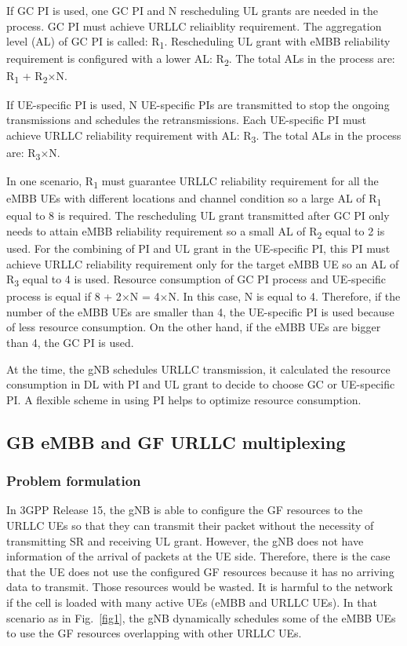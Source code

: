 \documentclass{ieeeaccess}
\begin{document}
If GC PI is used, one GC PI and N rescheduling UL grants are needed in the process. GC PI must achieve URLLC reliaiblity requirement. The aggregation level (AL) of GC PI is called: R\textsubscript{1}. Rescheduling UL grant with eMBB reliability requirement is configured with a lower AL: R\textsubscript{2}. The total ALs in the process are: R\textsubscript{1} + R\textsubscript{2}$\times$N.

If UE-specific PI is used, N UE-specific PIs are transmitted to stop the ongoing transmissions and schedules the retransmissions. Each UE-specific PI must achieve URLLC reliability requirement with AL: R\textsubscript{3}. The total ALs in the process are: R\textsubscript{3}$\times$N.

In one scenario, R\textsubscript{1} must guarantee URLLC reliability requirement for all the eMBB UEs with different locations and channel condition so a large AL of R\textsubscript{1} equal to 8 is required. The rescheduling UL grant transmitted after GC PI only needs to attain eMBB reliability requirement so a small AL of R\textsubscript{2} equal to 2 is used. For the combining of PI and UL grant in the UE-specific PI, this PI must achieve URLLC reliability requirement only for the target eMBB UE so an AL of R\textsubscript{3} equal to 4 is used. Resource consumption of GC PI process and UE-specific process is equal if 8 + 2$\times$N  = 4$\times$N. In this case, N is equal to 4. Therefore, if the number of the eMBB UEs are smaller than 4, the UE-specific PI is used because of less resource consumption. On the other hand, if the eMBB UEs are bigger than 4, the GC PI is used.

At the time, the gNB schedules URLLC transmission, it calculated the resource consumption in DL with PI and UL grant to decide to choose GC or UE-specific PI. A flexible scheme in using PI helps to optimize resource consumption.

\subsection{GB eMBB and GF URLLC multiplexing}\label{IIB}
\subsubsection{Problem formulation}\label{IIB1}
In 3GPP Release 15, the gNB is able to configure the GF resources to the URLLC UEs so that they can transmit their packet without the necessity of transmitting SR and receiving UL grant. However, the gNB does not have information of the arrival of packets at the UE side. Therefore, there is the case that the UE does not use the configured GF resources because it has no arriving data to transmit. Those resources would be wasted. It is harmful to the network if the cell is loaded with many active UEs (eMBB and URLLC UEs). In that scenario as in Fig.~\ref{fig1}, the gNB dynamically schedules some of the eMBB UEs to use the GF resources overlapping with other URLLC UEs.
\end{document}
